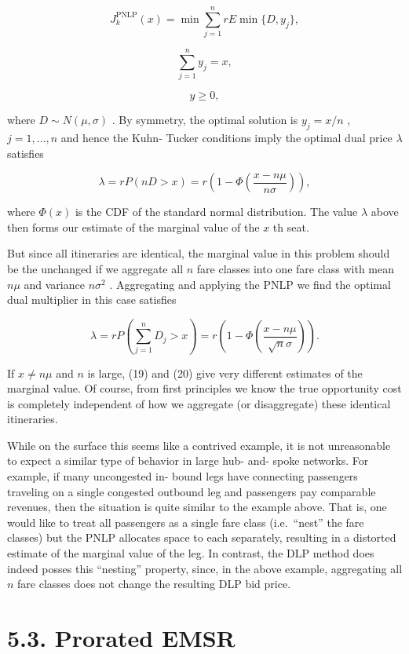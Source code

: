 \[
J_{k}^{\mathrm{PNLP}}(x) = \min \sum_{j = 1}^{n}r E\min \{D,y_{j}\} ,
\]

\[
\sum_{j = 1}^{n}y_{j} = x,
\]

\[
y\geq 0,
\]

where \(D \sim N(\mu , \sigma)\) . By symmetry, the optimal solution is
\(y_{j} = x / n\) , \(j = 1, \ldots , n\) and hence the Kuhn- Tucker
conditions imply the optimal dual price \(\lambda\) satisfies

\[
\lambda = r P(n D > x) = r\left(1 - \Phi \left(\frac{x - n\mu}{n\sigma}\right)\right), \tag{19}
\]

where \(\Phi (x)\) is the CDF of the standard normal distribution. The
value \(\lambda\) above then forms our estimate of the marginal value of
the \(x\) th seat.

But since all itineraries are identical, the marginal value in this
problem should be the unchanged if we aggregate all \(n\) fare classes
into one fare class with mean \(n\mu\) and variance \(n\sigma^{2}\) .
Aggregating and applying the PNLP we find the optimal dual multiplier in
this case satisfies

\[
\lambda = r P\left(\sum_{j = 1}^{n}D_{j} > x\right) = r\left(1 - \Phi \left(\frac{x - n\mu}{\sqrt{n}\sigma}\right)\right). \tag{20}
\]

If \(x \neq n\mu\) and \(n\) is large, (19) and (20) give very different
estimates of the marginal value. Of course, from first principles we
know the true opportunity cost is completely independent of how we
aggregate (or disaggregate) these identical itineraries.

While on the surface this seems like a contrived example, it is not
unreasonable to expect a similar type of behavior in large hub- and-
spoke networks. For example, if many uncongested in- bound legs have
connecting passengers traveling on a single congested outbound leg and
passengers pay comparable revenues, then the situation is quite similar
to the example above. That is, one would like to treat all passengers as
a single fare class (i.e.~``nest'' the fare classes) but the PNLP
allocates space to each separately, resulting in a distorted estimate of
the marginal value of the leg. In contrast, the DLP method does indeed
posses this ``nesting'' property, since, in the above example,
aggregating all \(n\) fare classes does not change the resulting DLP bid
price.

\section{5.3. Prorated EMSR}\label{prorated-emsr}

